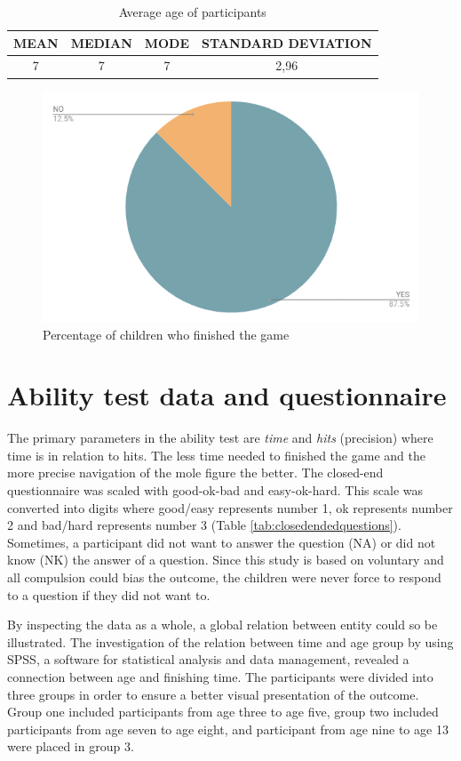 \renewcommand{\arraystretch}{1.5}

\begin{table}[!ht]
    \centering
    \begin{tabular}{c|c|c|c}
    \hline
        \multicolumn{1}{|c|}{MEAN} &
        \multicolumn{1}{c|}{MEDIAN} &
        \multicolumn{1}{c|}{MODE} &
        \multicolumn{1}{c|}{STANDARD DEVIATION}\\ \hline
       \multicolumn{1}{|c|}{7} &
        \multicolumn{1}{c|}{7} &
        \multicolumn{1}{c|}{7} &
        \multicolumn{1}{c|}{2,96} \\ \hline
    \end{tabular}
    \caption{Average age of participants}
    \label{tab:agestatistic}
\end{table}


\begin{figure}[!ht]
   \centering
    \includegraphics[width=.4\textwidth]{figures/finishedgame.png}
    \caption{Percentage of children who finished the game}
    \label{fig:finishedgame}
\end{figure}

\newpage


\section{Ability test data and questionnaire}
The primary parameters in the ability test are \textit{time} and \textit{hits} (precision) where time is in relation to hits. The less time needed to finished the game and the more precise navigation of the mole figure the better.
The closed-end questionnaire was scaled with good-ok-bad and easy-ok-hard. This scale was converted into digits where good/easy represents number 1, ok represents number 2 and bad/hard represents number 3 (Table \ref{tab:closedendedquestions}).
Sometimes, a participant did not want to answer the question (NA) or did not know (NK) the answer of a question. Since this study is based on voluntary and all compulsion could bias the outcome, the children were never force to respond to a question if they did not want to.

By inspecting the data as a whole, a global relation between entity could so be illustrated. The investigation of the relation between time and age group by using SPSS, a software for statistical analysis and data management, revealed a connection between age and finishing time. The participants were divided into three groups in order to ensure a better visual presentation of the outcome. Group one included participants from age three to age five, group two included participants from age seven to age eight, and participant from age nine to age 13 were placed in group 3.


